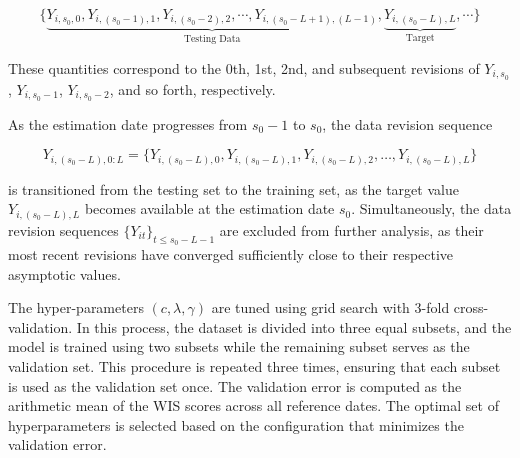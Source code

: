 $$\{\underbrace{Y_{i,s_0,0}, Y_{i, (s_0-1), 1}, Y_{i, (s_0-2), 2}, \cdots, Y_{i, (s_0 -L +1),(L-1)}}_\text{Testing Data}, \underbrace{Y_{i, (s_0-L), L}}_\text{Target},  \cdots \}$$

These quantities correspond to the 0th, 1st, 2nd, and subsequent revisions of $Y_{i, s_0}$, $Y_{i, s_0-1}$, $Y_{i, s_0-2}$, and so forth, respectively. 

As the estimation date progresses from $s_0 -1$ to $s_0$, the data revision sequence

$$ Y_{i,(s_0-L),0:L} = \{Y_{i, (s_0-L), 0}, Y_{i, (s_0-L), 1}, Y_{i, (s_0-L), 2}, \dots, Y_{i, (s_0-L), L}\} $$

is transitioned from the testing set to the training set, as the target value $Y_{i,(s_0-L), L}$ becomes available at the estimation date $s_0$. Simultaneously, the data revision sequences $\{Y_{it}\}_{t \leq s_0-L-1}$ are excluded from further analysis, as their most recent revisions have converged sufficiently close to their respective asymptotic values.

The hyper-parameters $(c, \lambda, \gamma)$ are tuned using grid search with 3-fold cross-validation. In this process, the dataset is divided into three equal subsets, and the model is trained using two subsets while the remaining subset serves as the validation set. This procedure is repeated three times, ensuring that each subset is used as the validation set once. The validation error is computed as the arithmetic mean of the WIS scores across all reference dates. The optimal set of hyperparameters is selected based on the configuration that minimizes the validation error.








